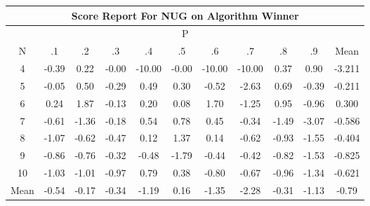 \documentclass[11pt,a4paper]{report}
\begin{document}
\begin{longtable}{ | c || c | c | c | c | c | c | c | c | c || c |}
\hline
\multicolumn{11}{|c|}{ Score Report For NUG on Algorithm Winner} \\
\hline
\multicolumn{11}{|c|}{ P } \\
\hline
N & .1 & .2 & .3 & .4 & .5 & .6 & .7 & .8 & .9 & Mean\\
 \hline
 \hline
 \endhead
  4 &  \cellcolor[HTML]{FFF7F7} -0.39 &  \cellcolor[HTML]{F7F7FF} 0.22 &  \cellcolor[HTML]{FFFFFF} -0.00 &  \cellcolor[HTML]{FF0000} -10.00 &  \cellcolor[HTML]{FFFFFF} -0.00 &  \cellcolor[HTML]{FF0000} -10.00 &  \cellcolor[HTML]{FF0000} -10.00 &  \cellcolor[HTML]{F7F7FF} 0.37 &  \cellcolor[HTML]{E7E7FF} 0.90 & -3.211 \\
  5 &  \cellcolor[HTML]{FFFFFF} -0.05 &  \cellcolor[HTML]{EFEFFF} 0.50 &  \cellcolor[HTML]{FFF7F7} -0.29 &  \cellcolor[HTML]{EFEFFF} 0.49 &  \cellcolor[HTML]{F7F7FF} 0.30 &  \cellcolor[HTML]{FFEFEF} -0.52 &  \cellcolor[HTML]{FFBFBF} -2.63 &  \cellcolor[HTML]{EFEFFF} 0.69 &  \cellcolor[HTML]{FFF7F7} -0.39 & -0.211 \\
  6 &  \cellcolor[HTML]{F7F7FF} 0.24 &  \cellcolor[HTML]{CFCFFF} 1.87 &  \cellcolor[HTML]{FFFFFF} -0.13 &  \cellcolor[HTML]{F7F7FF} 0.20 &  \cellcolor[HTML]{FFFFFF} 0.08 &  \cellcolor[HTML]{D7D7FF} 1.70 &  \cellcolor[HTML]{FFDFDF} -1.25 &  \cellcolor[HTML]{E7E7FF} 0.95 &  \cellcolor[HTML]{FFE7E7} -0.96 & 0.300 \\
  7 &  \cellcolor[HTML]{FFEFEF} -0.61 &  \cellcolor[HTML]{FFDFDF} -1.36 &  \cellcolor[HTML]{FFF7F7} -0.18 &  \cellcolor[HTML]{EFEFFF} 0.54 &  \cellcolor[HTML]{EFEFFF} 0.78 &  \cellcolor[HTML]{F7F7FF} 0.45 &  \cellcolor[HTML]{FFF7F7} -0.34 &  \cellcolor[HTML]{FFD7D7} -1.49 &  \cellcolor[HTML]{FFAFAF} -3.07 & -0.586 \\
  8 &  \cellcolor[HTML]{FFE7E7} -1.07 &  \cellcolor[HTML]{FFEFEF} -0.62 &  \cellcolor[HTML]{FFF7F7} -0.47 &  \cellcolor[HTML]{FFFFFF} 0.12 &  \cellcolor[HTML]{DFDFFF} 1.37 &  \cellcolor[HTML]{FFFFFF} 0.14 &  \cellcolor[HTML]{FFEFEF} -0.62 &  \cellcolor[HTML]{FFE7E7} -0.93 &  \cellcolor[HTML]{FFD7D7} -1.55 & -0.404 \\
  9 &  \cellcolor[HTML]{FFE7E7} -0.86 &  \cellcolor[HTML]{FFEFEF} -0.76 &  \cellcolor[HTML]{FFF7F7} -0.32 &  \cellcolor[HTML]{FFEFEF} -0.48 &  \cellcolor[HTML]{FFCFCF} -1.79 &  \cellcolor[HTML]{FFF7F7} -0.44 &  \cellcolor[HTML]{FFF7F7} -0.42 &  \cellcolor[HTML]{FFE7E7} -0.82 &  \cellcolor[HTML]{FFD7D7} -1.53 & -0.825 \\
  10 &  \cellcolor[HTML]{FFE7E7} -1.03 &  \cellcolor[HTML]{FFE7E7} -1.01 &  \cellcolor[HTML]{FFE7E7} -0.97 &  \cellcolor[HTML]{EFEFFF} 0.79 &  \cellcolor[HTML]{F7F7FF} 0.38 &  \cellcolor[HTML]{FFE7E7} -0.80 &  \cellcolor[HTML]{FFEFEF} -0.67 &  \cellcolor[HTML]{FFE7E7} -0.96 &  \cellcolor[HTML]{FFDFDF} -1.34 & -0.621 \\
 \hline
 \hline
Mean &  \cellcolor[HTML]{FFEFEF} -0.54 &  \cellcolor[HTML]{FFF7F7} -0.17 &  \cellcolor[HTML]{FFF7F7} -0.34 &  \cellcolor[HTML]{FFDFDF} -1.19 &  \cellcolor[HTML]{F7F7FF} 0.16 &  \cellcolor[HTML]{FFDFDF} -1.35 &  \cellcolor[HTML]{FFC7C7} -2.28 &  \cellcolor[HTML]{FFF7F7} -0.31 &  \cellcolor[HTML]{FFDFDF} -1.13 &  \cellcolor[HTML]{FFE7E7} -0.79
\end{longtable}
\end{document}

